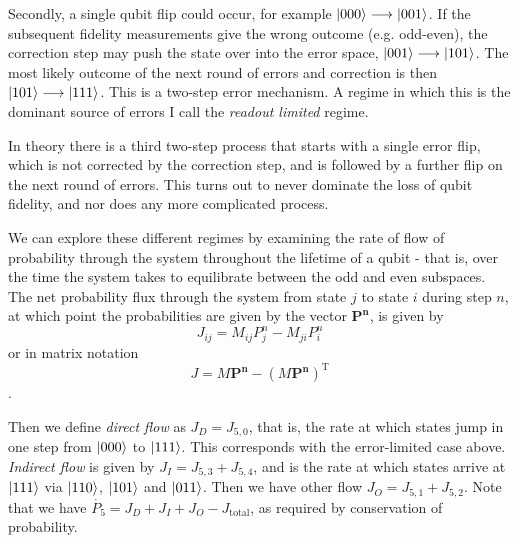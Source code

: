 \documentclass{report}
\begin{document}
\begin{appendices}
Secondly, a single qubit flip could occur, for example $\ket{000} \longrightarrow \ket{001}$. If the subsequent fidelity measurements give the wrong outcome (e.g. odd-even), the correction step may push the state over into the error space, $\ket{001} \longrightarrow \ket{101}$. The most likely outcome of the next round of errors and correction is then $\ket{101} \longrightarrow \ket{111}$. This is a two-step error mechanism. A regime in which this is the dominant source of errors I call the \textit{readout limited} regime.

In theory there is a third two-step process that starts with a single error flip, which is not corrected by the correction step, and is followed by a further flip on the next round of errors. This turns out to never dominate the loss of qubit fidelity, and nor does any more complicated process.

We can explore these different regimes by examining the rate of flow of probability through the system throughout the lifetime of a qubit - that is, over the time the system takes to equilibrate between the odd and even subspaces. The net probability flux through the system from state $j$ to state $i$ during step $n$, at which point the probabilities are given by the vector $\mathbf{P^n}$, is given by
\begin{equation*}
    J_{ij} = M_{ij}P^n_j - M_{ji} P^n_i
\end{equation*}
or in matrix notation
\begin{equation*}
    J = M\mathbf{P^n} - (M \mathbf{P^n})^\mathrm{T}
\end{equation*}.

Then we define \textit{direct flow} as $J_D = J_{5,0}$, that is, the rate at which states jump in one step from $\ket{000}$ to $\ket{111}$. This corresponds with the error-limited case above. \textit{Indirect flow} is given by $J_I = J_{5,3} + J_{5,4}$, and is the rate at which states arrive at $\ket{111}$ via $\ket{110}$, $\ket{101}$ and $\ket{011}$. Then we have other flow $J_O = J_{5,1} + J_{5,2}$. Note that we have $\dot{P_5} = J_D + J_I + J_O - J_\mathrm{total}$, as required by conservation of probability.


\end{appendices}
\end{document}
